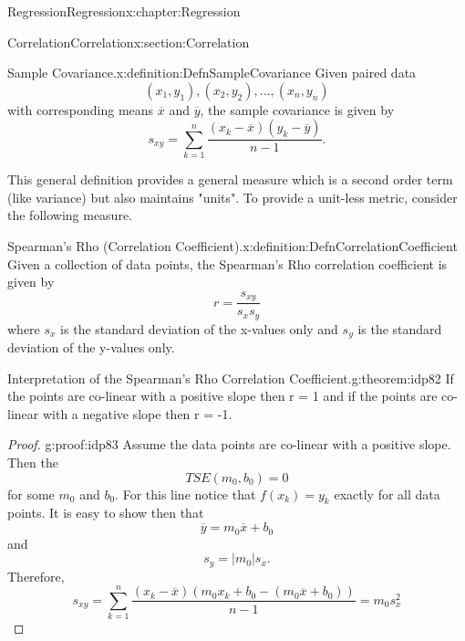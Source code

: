 \documentclass[oneside,10pt,]{book}
\numberwithin{equation}{section}
\begin{document}
\begin{chapterptx}{Regression}{}{Regression}{}{}{x:chapter:Regression}
\begin{sectionptx}{Correlation}{}{Correlation}{}{}{x:section:Correlation}
\begin{definition}{Sample Covariance.}{x:definition:DefnSampleCovariance}%
Given paired data%
\begin{equation*}
(x_1,y_1), (x_2,y_2), ... , (x_n,y_n)
\end{equation*}
with corresponding means \(\overline{x}\) and \(\overline{y}\), the sample covariance is given by%
\begin{equation*}
s_{xy} = \sum_{k=1}^n \frac{(x_k-\overline{x})(y_k-\overline{y})}{n-1}.
\end{equation*}
%
\end{definition}
This general definition provides a general measure which is a second order term (like variance) but also maintains "units". To provide a unit-less metric, consider the following measure.%
\begin{definition}{Spearman's Rho (Correlation Coefficient).}{x:definition:DefnCorrelationCoefficient}%
Given a collection of data points, the Spearman's Rho correlation coefficient is given by%
\begin{equation*}
r = \frac{s_{xy}}{s_x s_y}
\end{equation*}
where \(s_x\) is the standard deviation of the x-values only and \(s_y\) is the standard deviation of the y-values only.%
\end{definition}
\begin{theorem}{Interpretation of the Spearman's Rho Correlation Coefficient.}{}{g:theorem:idp82}%
If the points are co-linear with a positive slope then r = 1 and if the points are co-linear with a negative slope then r = -1.\end{theorem}
\begin{proof}{}{g:proof:idp83}
Assume the data points are co-linear with a positive slope. Then the%
\begin{equation*}
TSE(m_0,b_0) = 0
\end{equation*}
for some \(m_0\) and \(b_0\). For this line notice that \(f(x_k) = y_k\) exactly for all data points. It is easy to show then that%
\begin{equation*}
\overline{y} = m_0 \overline{x} + b_0
\end{equation*}
and%
\begin{equation*}
s_y = | m_0 | s_x\text{.}
\end{equation*}
Therefore,%
\begin{equation*}
s_{xy} = \sum_{k=1}^n \frac{(x_k - \overline{x})(m_0 x_k + b_0 - (m_0 \overline{x} + b_0))}{n-1} = m_0 s_x^2
\end{equation*}

\end{proof}
\end{sectionptx}
\end{chapterptx}
\end{document}
